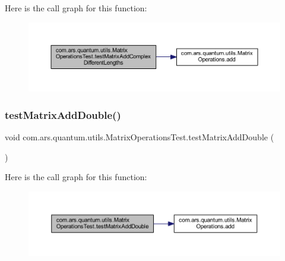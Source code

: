 Here is the call graph for this function\+:\nopagebreak
\begin{figure}[H]
\begin{center}
\leavevmode
\includegraphics[width=350pt]{classcom_1_1ars_1_1quantum_1_1utils_1_1_matrix_operations_test_a6a11674dd3048492205cfcbd810650a4_cgraph}
\end{center}
\end{figure}
\hypertarget{classcom_1_1ars_1_1quantum_1_1utils_1_1_matrix_operations_test_a9dd0cf555f9f6a02e67c400bd2ef6e8b}{}\label{classcom_1_1ars_1_1quantum_1_1utils_1_1_matrix_operations_test_a9dd0cf555f9f6a02e67c400bd2ef6e8b} 
\subsubsection{\texorpdfstring{test\+Matrix\+Add\+Double()}{testMatrixAddDouble()}}
{\footnotesize\ttfamily void com.\+ars.\+quantum.\+utils.\+Matrix\+Operations\+Test.\+test\+Matrix\+Add\+Double (\begin{DoxyParamCaption}{ }\end{DoxyParamCaption})}

Here is the call graph for this function\+:\nopagebreak
\begin{figure}[H]
\begin{center}
\leavevmode
\includegraphics[width=350pt]{classcom_1_1ars_1_1quantum_1_1utils_1_1_matrix_operations_test_a9dd0cf555f9f6a02e67c400bd2ef6e8b_cgraph}
\end{center}
\end{figure}
\hypertarget{classcom_1_1ars_1_1quantum_1_1utils_1_1_matrix_operations_test_a95be19fcaf80e4fa48732d3a03c55afc}{}\label{classcom_1_1ars_1_1quantum_1_1utils_1_1_matrix_operations_test_a95be19fcaf80e4fa48732d3a03c55afc} 
